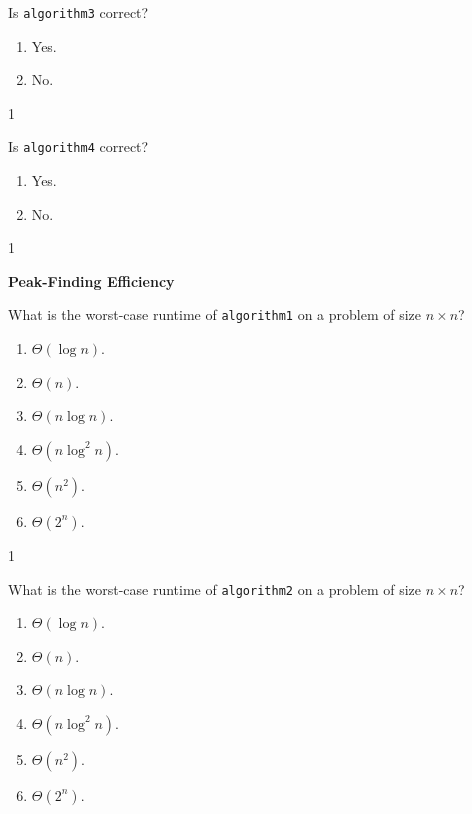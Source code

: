 \documentclass[12pt,twoside]{article}
\begin{document}
\begin{problems}
\begin{problemparts}
\problempart {} Is \texttt{algorithm3} correct?
\begin{enumerate}
\item Yes.
\item No.
\end{enumerate}

\ifsolution \solution{}
1
\fi

\problempart {} Is \texttt{algorithm4} correct?
\begin{enumerate}
\item Yes.
\item No.
\end{enumerate}

\ifsolution \solution{}
1
\fi

\end{problemparts}

\problem {} \textbf{Peak-Finding Efficiency}

\begin{problemparts}

\problempart {} What is the worst-case runtime of \texttt{algorithm1} on a problem of size $n \times n$?
\begin{enumerate}
\item $\Theta(\log n)$.
\item $\Theta(n)$.
\item $\Theta(n \log n)$.
\item $\Theta(n \log^2 n)$.
\item $\Theta(n^2)$.
\item $\Theta(2^n)$.
\end{enumerate}

\ifsolution \solution{}
1
\fi

\problempart {} What is the worst-case runtime of \texttt{algorithm2} on a problem of size $n \times n$?
\begin{enumerate}
\item $\Theta(\log n)$.
\item $\Theta(n)$.
\item $\Theta(n \log n)$.
\item $\Theta(n \log^2 n)$.
\item $\Theta(n^2)$.
\item $\Theta(2^n)$.
\end{enumerate}


\end{problemparts}
\end{problems}
\end{document}
